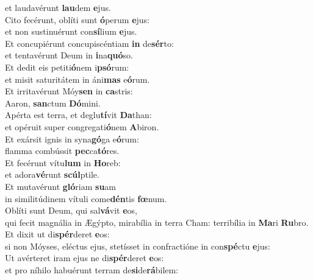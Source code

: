 \oddverse et laudavérunt \textbf{lau}dem \textbf{e}jus.\\
\evenverse Cito fecérunt, oblíti sunt \textbf{ó}perum \textbf{e}jus:~\*\\
\evenverse et non sustinuérunt con\textbf{sí}lium \textbf{e}jus.\\
\oddverse Et concupiérunt concupiscéntiam \textbf{in} de\textbf{sér}to:~\*\\
\oddverse et tentavérunt Deum in \textbf{i}na\textbf{quó}so.\\
\evenverse Et dedit eis petiti\textbf{ó}nem i\textbf{psó}rum:~\*\\
\evenverse et misit saturitátem in áni\textbf{mas} e\textbf{ó}rum.\\
\oddverse Et irritavérunt Móy\textbf{sen} in \textbf{ca}stris:~\*\\
\oddverse Aaron, \textbf{san}ctum \textbf{Dó}mini.\\
\evenverse Apérta est terra, et deglu\textbf{tí}vit \textbf{Da}than:~\*\\
\evenverse et opéruit super congregati\textbf{ó}nem \textbf{A}biron.\\
\oddverse Et exársit ignis in syna\textbf{gó}ga e\textbf{ó}rum:~\*\\
\oddverse flamma combússit \textbf{pec}ca\textbf{tó}res.\\
\evenverse Et fecérunt vítu\textbf{lum} in \textbf{Ho}reb:~\*\\
\evenverse et adora\textbf{vé}runt \textbf{scúl}ptile.\\
\oddverse Et mutavérunt \textbf{gló}riam \textbf{su}am~\*\\
\oddverse in similitúdinem vítuli come\textbf{dén}tis \textbf{fœ}num.\\
\evenverse Oblíti sunt Deum, qui sal\textbf{vá}vit \textbf{e}os,~\*\\
\evenverse qui fecit magnália in Ægýpto, mirabília in terra Cham: terribília in \textbf{Ma}ri \textbf{Ru}bro.\\
\oddverse Et dixit ut di\textbf{spér}deret \textbf{e}os:~\*\\
\oddverse si non Móyses, eléctus ejus, stetísset in confractióne in con\textbf{spé}ctu \textbf{e}jus:\\
\evenverse Ut avérteret iram ejus ne di\textbf{spér}deret \textbf{e}os:~\*\\
\evenverse et pro níhilo habuérunt terram de\textbf{si}de\textbf{rá}bilem:\\

